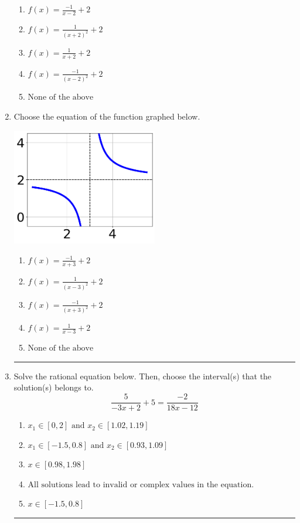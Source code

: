 \documentclass[14pt]{extbook}
\newcommand{\litem}[1]{\item#1\hspace*{-1cm}\rule{\textwidth}{0.4pt}}
\begin{document}
\begin{enumerate}
{\begin{center}
\end{center}
\begin{enumerate}[label=\Alph*.]
\item \( f(x) = \frac{-1}{x - 2} + 2 \)
\item \( f(x) = \frac{1}{(x + 2)^2} + 2 \)
\item \( f(x) = \frac{1}{x + 2} + 2 \)
\item \( f(x) = \frac{-1}{(x - 2)^2} + 2 \)
\item \( \text{None of the above} \)

\end{enumerate} }
\litem{
Choose the equation of the function graphed below.
\begin{center}
    \includegraphics[width=0.5\textwidth]{../Figures/rationalGraphToEquationCopyA.png}
\end{center}
\begin{enumerate}[label=\Alph*.]
\item \( f(x) = \frac{-1}{x + 3} + 2 \)
\item \( f(x) = \frac{1}{(x - 3)^2} + 2 \)
\item \( f(x) = \frac{-1}{(x + 3)^2} + 2 \)
\item \( f(x) = \frac{1}{x - 3} + 2 \)
\item \( \text{None of the above} \)

\end{enumerate} }
\litem{
Solve the rational equation below. Then, choose the interval(s) that the solution(s) belongs to.\[ \frac{5}{-3x + 2} + 5 = \frac{-2}{18x -12} \]\begin{enumerate}[label=\Alph*.]
\item \( x_1 \in [0, 2] \text{ and } x_2 \in [1.02,1.19] \)
\item \( x_1 \in [-1.5, 0.8] \text{ and } x_2 \in [0.93,1.09] \)
\item \( x \in [0.98,1.98] \)
\item \( \text{All solutions lead to invalid or complex values in the equation.} \)
\item \( x \in [-1.5,0.8] \)


\end{enumerate}}
\end{enumerate}
\end{document}
